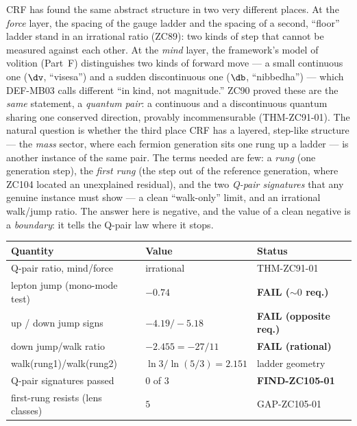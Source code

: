 \documentclass[12pt, a4paper]{article}
\begin{document}
CRF has found the same abstract structure in two very different places. At the
\emph{force} layer, the spacing of the gauge ladder and the spacing of a second,
``floor'' ladder stand in an irrational ratio (ZC89): two kinds of step that
cannot be measured against each other. At the \emph{mind} layer, the framework's
model of volition (Part~F) distinguishes two kinds of forward move --- a small
continuous one ($\dv$, ``visesa'') and a sudden discontinuous one ($\db$,
``nibbedha'') --- which DEF-MB03 calls different ``in kind, not magnitude.'' ZC90
proved these are the \emph{same} statement, a \emph{quantum pair}: a continuous
and a discontinuous quantum sharing one conserved direction, provably
incommensurable (THM-ZC91-01). The natural question is whether the third place
CRF has a layered, step-like structure --- the \emph{mass} sector, where each
fermion generation sits one rung up a ladder --- is another instance of the same
pair. The terms needed are few: a \emph{rung} (one generation step), the
\emph{first rung} (the step out of the reference generation, where ZC104 located
an unexplained residual), and the two \emph{Q-pair signatures} that any genuine
instance must show --- a clean ``walk-only'' limit, and an irrational walk/jump
ratio. The answer here is negative, and the value of a clean negative is a
\emph{boundary}: it tells the Q-pair law where it stops.

\begin{keybox}[title={Numerical Summary --- ZC105 (T-canonical)}]
{\small\renewcommand{\arraystretch}{1.25}
\begin{center}
\begin{tabular}{@{}p{6.6cm}p{3.0cm}p{2.8cm}@{}}
\toprule
\textbf{Quantity} & \textbf{Value} & \textbf{Status} \\
\midrule
Q-pair ratio, mind/force            & irrational      & THM-ZC91-01 \\
lepton jump (mono-mode test)        & $-0.74$         & \textbf{FAIL ($\sim0$ req.)} \\
up / down jump signs                 & $-4.19/{-}5.18$ & \textbf{FAIL (opposite req.)} \\
down jump/walk ratio                 & $-2.455=-27/11$ & \textbf{FAIL (rational)} \\
walk(rung1)/walk(rung2)              & $\ln3/\ln(5/3)=2.151$ & ladder geometry \\
Q-pair signatures passed             & $0$ of $3$      & \textbf{FIND-ZC105-01} \\
first-rung resists (lens classes)    & $5$             & GAP-ZC105-01 \\
\bottomrule
\end{tabular}
\end{center}}
\end{keybox}
\end{document}
